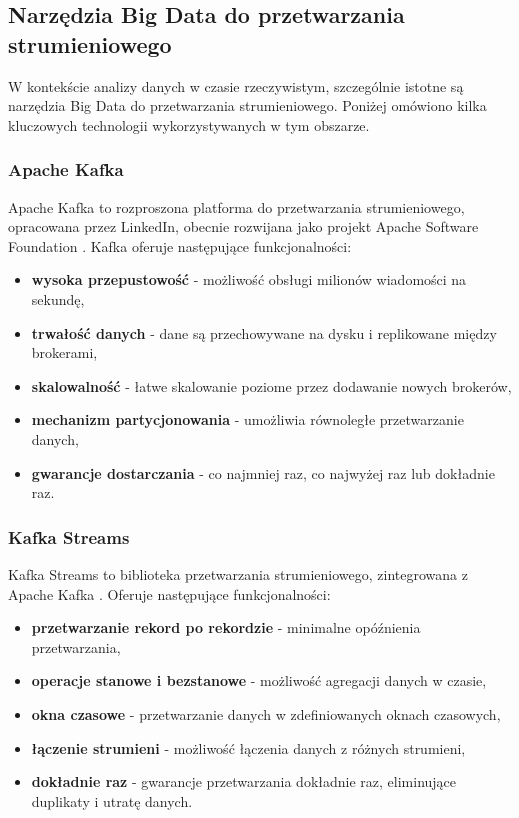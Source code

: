 \subsection{Narzędzia Big Data do przetwarzania strumieniowego}
\label{subsec:narzedzia_big_data}

W kontekście analizy danych w czasie rzeczywistym, szczególnie istotne są narzędzia Big Data do przetwarzania strumieniowego.
Poniżej omówiono kilka kluczowych technologii wykorzystywanych w tym obszarze.

\subsubsection{Apache Kafka}
\label{subsubsec:apache_kafka}

Apache Kafka to rozproszona platforma do przetwarzania strumieniowego, opracowana przez LinkedIn, obecnie rozwijana jako projekt
Apache Software Foundation \cite{kafka}. Kafka oferuje następujące funkcjonalności:

\begin{itemize}
    \item \textbf{wysoka przepustowość} - możliwość obsługi milionów wiadomości na sekundę,
    \item \textbf{trwałość danych} - dane są przechowywane na dysku i replikowane między brokerami,
    \item \textbf{skalowalność} - łatwe skalowanie poziome przez dodawanie nowych brokerów,
    \item \textbf{mechanizm partycjonowania} - umożliwia równoległe przetwarzanie danych,
    \item \textbf{gwarancje dostarczania} - co najmniej raz, co najwyżej raz lub dokładnie raz.
\end{itemize}

\subsubsection{Kafka Streams}
\label{subsubsec:kafka_streams}

Kafka Streams to biblioteka przetwarzania strumieniowego, zintegrowana z Apache Kafka \cite{kafka_streams}. Oferuje następujące funkcjonalności:

\begin{itemize}
    \item \textbf{przetwarzanie rekord po rekordzie} - minimalne opóźnienia przetwarzania,
    \item \textbf{operacje stanowe i bezstanowe} - możliwość agregacji danych w czasie,
    \item \textbf{okna czasowe} - przetwarzanie danych w zdefiniowanych oknach czasowych,
    \item \textbf{łączenie strumieni} - możliwość łączenia danych z różnych strumieni,
    \item \textbf{dokładnie raz} - gwarancje przetwarzania dokładnie raz, eliminujące duplikaty i utratę danych.
\end{itemize}

